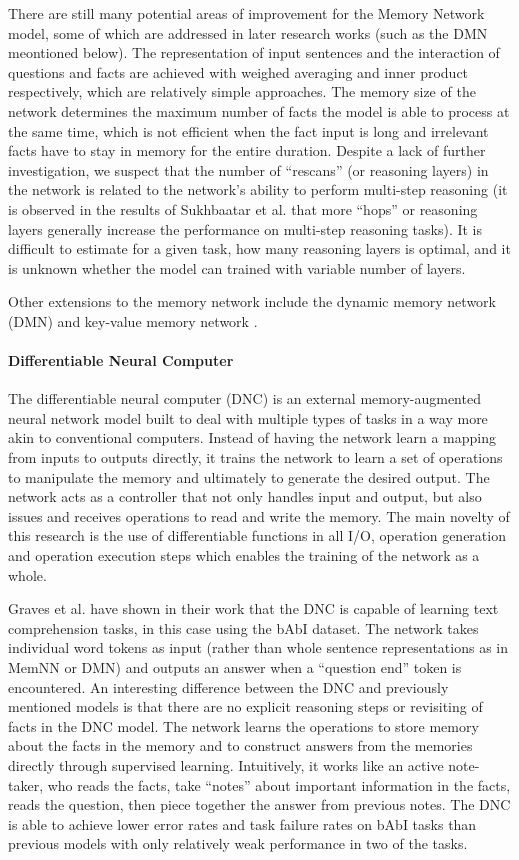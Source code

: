 \documentclass[]{article}
\begin{document}
There are still many potential areas of improvement for the Memory Network model, some of which are addressed in later research works (such as the DMN meontioned below). The representation of input sentences and the interaction of questions and facts are achieved with weighed averaging and inner product respectively, which are relatively simple approaches. The memory size of the network determines the maximum number of facts the model is able to process at the same time, which is not efficient when the fact input is long and irrelevant facts have to stay in memory for the entire duration. Despite a lack of further investigation, we suspect that the number of “rescans” (or reasoning layers) in the network is related to the network’s ability to perform multi-step reasoning (it is observed in the results of Sukhbaatar et al. that more “hops” or reasoning layers generally increase the performance on multi-step reasoning tasks). It is difficult to estimate for a given task, how many reasoning layers is optimal, and it is unknown whether the model can trained with variable number of layers.

Other extensions to the memory network include the dynamic memory network (DMN) \cite{kumar2016ask} and key-value memory network \cite{miller2016key}.

\paragraph{Differentiable Neural Computer}
The differentiable neural computer (DNC) \cite{graves2016hybrid} is an external memory-augmented neural network model built to deal with multiple types of tasks in a way more akin to conventional computers. Instead of having the network learn a mapping from inputs to outputs directly, it trains the network to learn a set of operations to manipulate the memory and ultimately to generate the desired output. The network acts as a controller that not only handles input and output, but also issues and receives operations to read and write the memory. The main novelty of this research is the use of differentiable functions in all I/O, operation generation and operation execution steps which enables the training of the network as a whole. 

Graves et al. \cite{graves2016hybrid} have shown in their work that the DNC is capable of learning text comprehension tasks, in this case using the bAbI dataset. The network takes individual word tokens as input (rather than whole sentence representations as in MemNN or DMN) and outputs an answer when a “question end” token is encountered.  An interesting difference between the DNC and previously mentioned models is that there are no explicit reasoning steps or revisiting of facts in the DNC model. The network learns the operations to store memory about the facts in the memory and to construct answers from the memories directly through supervised learning. Intuitively, it works like an active note-taker, who reads the facts, take “notes” about important information in the facts, reads the question, then piece together the answer from previous notes. The DNC is able to achieve lower error rates and task failure rates on bAbI tasks than previous models with only relatively weak performance in two of the tasks.
\end{document}
